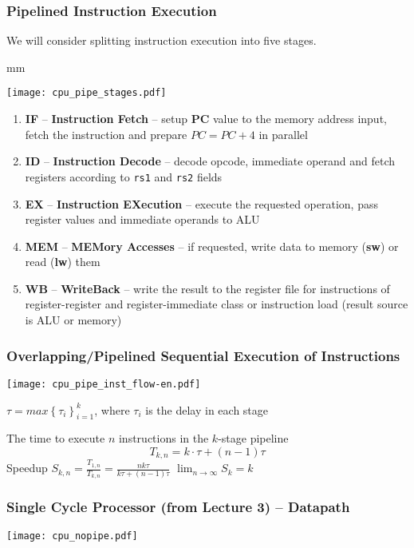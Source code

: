 \documentclass{beamer}
\begin{document}
\begin{frame}
\frametitle{Pipelined Instruction Execution}

We will consider splitting instruction execution into five stages.

 mm

{
\centering
\texttt{[image: cpu\_pipe\_stages.pdf]}
}

\begin{enumerate}
 \item \textbf{IF} -- \textbf{Instruction Fetch} -- setup \textbf{PC} value to the memory address input, fetch the instruction and prepare $PC = PC + 4$ in parallel
 \item \textbf{ID} -- \textbf{Instruction Decode} -- decode opcode, immediate operand and fetch registers according to \texttt{rs1} and \texttt{rs2} fields
 \item \textbf{EX} -- \textbf{Instruction EXecution} -- execute the requested operation, pass register values and immediate operands to ALU
 \item \textbf{MEM} -- \textbf{MEMory Accesses} -- if requested, write data to memory (\textbf{sw}) or read (\textbf{lw}) them
 \item \textbf{WB} -- \textbf{WriteBack} -- write the result to the register file for instructions of register-register and register-immediate class or instruction load (result source is ALU or memory)
\end{enumerate}

\end{frame}

\begin{frame}
\frametitle{Overlapping/Pipelined Sequential Execution of Instructions}
\texttt{[image: cpu\_pipe\_inst\_flow-en.pdf]}

$\tau = max{\left\lbrace \tau_i \right\rbrace}^k_{i=1}$, where $\tau_i$ is the delay in each stage

The time to execute $n$ instructions in the $k$-stage pipeline
$$T_{k,n} = k \cdot \tau + (n - 1) \tau$$
Speedup
\hskip 7mm
$S_{k,n} = \frac{T_{1,n}}{T_{k,n}} = \frac{n k \tau}{k \tau + (n - 1) \tau}$
\hskip 7mm
$\lim_{n \rightarrow \infty} S_k = k$

\end{frame}

\begin{frame}
\frametitle{Single Cycle Processor (from Lecture 3) -- Datapath}
\texttt{[image: cpu\_nopipe.pdf]}
\end{frame}
\end{document}
